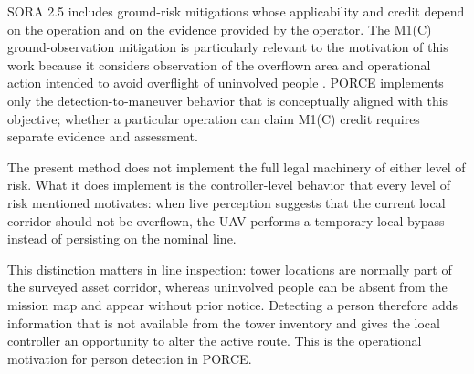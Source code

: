 \documentclass[electronics,article,submit,moreauthors]{Definitions/mdpi}
\DeclareRobustCommand{\deleted}[1]{}%
\DeclareRobustCommand{\added}[1]{#1}%
\DeclareRobustCommand{\deleted}[1]{\textcolor{black}{\sout{#1}}}
\DeclareRobustCommand{\added}[1]{\textcolor{green!50!black}{#1}}
\def\deleted#1{}%
\def\added#1{#1}%
\begin{document}
\deleted{This }SORA 2.5 \deleted{methodology presented by JARUS establishes a set of ground risk mitigation factors that can be applied to reduce the ground risk level of}\added{includes ground-risk mitigations whose applicability and credit depend on} the operation \deleted{before flight. This reduction in ground risk level is crucial, as it will imply a reduction in the intrinsic risk of a person being stuck by an UA and a reduction in the level of risk of the whole operation and will allow the aircraft to fly over the expected area without the need to pass a certification process. Inside these strategic mitigations, the 'M1 (C) mitigation-Ground observation' is directly related with the concept of 'uninvolved people'. This mitigation implies that the UAS crew or the systems inside the aircraft itself can observe most}\added{and on the evidence provided by the operator. The M1(C) ground-observation mitigation is particularly relevant to the motivation of this work because it considers observation} of the overflown area\deleted{, allowing the detection of 'uninvolved people' in the operational area and maneuvering the UA so that the 'uninvolved people' are not overflown \cite{EASA_AMC_GM_SORA25_2025}.}\added{ and operational action intended to avoid overflight of uninvolved people \cite{EASA_AMC_GM_SORA25_2025}. PORCE implements only the detection-to-maneuver behavior that is conceptually aligned with this objective; whether a particular operation can claim M1(C) credit requires separate evidence and assessment.}

 The present method does not implement the full legal machinery of either level of risk. What it does implement is the controller-level behavior that every level of risk mentioned motivates: when live perception suggests that the current local corridor should not be overflown, the UAV performs a temporary local bypass instead of persisting on the nominal line.

\added{This distinction matters in line inspection: tower locations are normally part of the surveyed asset corridor, whereas uninvolved people can be absent from the mission map and appear without prior notice. Detecting a person therefore adds information that is not available from the tower inventory and gives the local controller an opportunity to alter the active route. This is the operational motivation for person detection in PORCE.}
\end{document}
